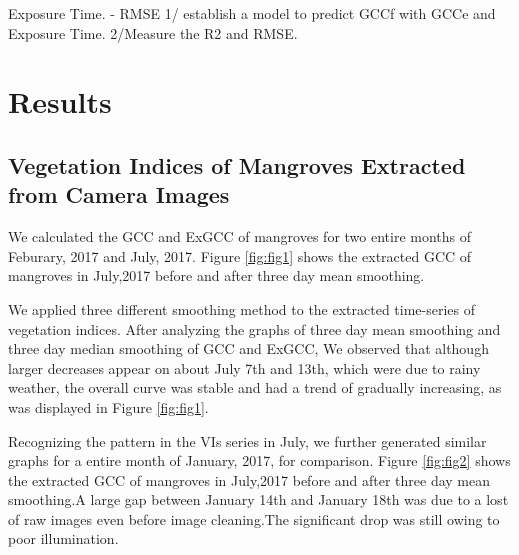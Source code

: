 \documentclass{article}
\begin{document}
Exposure Time.  - RMSE 1/ establish a model to predict GCCf with GCCe and Exposure Time. 2/Measure the R2 and RMSE. 


\subsubsection{}



\section{Results} 





\subsection{Vegetation Indices of Mangroves Extracted from Camera Images}
We calculated the GCC and ExGCC of mangroves for two entire months of Feburary, 2017 and July, 2017. Figure \ref{fig:fig1} shows the extracted GCC of mangroves in July,2017 before and after three day mean smoothing.


We applied three different smoothing method to the extracted time-series of vegetation indices. After analyzing the graphs of three day mean smoothing and three day median smoothing of GCC and ExGCC, We observed that although larger decreases appear on about July 7th and 13th, which were due to rainy weather, the overall curve was stable and had a trend of gradually increasing, as was displayed in Figure \ref{fig:fig1}.


Recognizing the pattern in the VIs series in July, we further generated similar graphs for a entire month of January, 2017, for comparison.
Figure \ref{fig:fig2} shows the extracted GCC of mangroves in July,2017 before and after three day mean smoothing.A large gap between January 14th and January 18th was due to a lost of raw images even before image cleaning.The significant drop was still owing to poor illumination.
\end{document}
